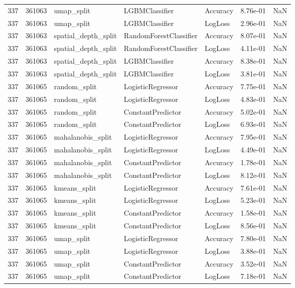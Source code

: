 \begin{tabular}{rrlllrr}
337 & 361063 & umap\_split & LGBMClassifier & Accuracy & 8.76e-01 & NaN \\
337 & 361063 & umap\_split & LGBMClassifier & LogLoss & 2.96e-01 & NaN \\
337 & 361063 & spatial\_depth\_split & RandomForestClassifier & Accuracy & 8.07e-01 & NaN \\
337 & 361063 & spatial\_depth\_split & RandomForestClassifier & LogLoss & 4.11e-01 & NaN \\
337 & 361063 & spatial\_depth\_split & LGBMClassifier & Accuracy & 8.38e-01 & NaN \\
337 & 361063 & spatial\_depth\_split & LGBMClassifier & LogLoss & 3.81e-01 & NaN \\
337 & 361065 & random\_split & LogisticRegressor & Accuracy & 7.75e-01 & NaN \\
337 & 361065 & random\_split & LogisticRegressor & LogLoss & 4.83e-01 & NaN \\
337 & 361065 & random\_split & ConstantPredictor & Accuracy & 5.02e-01 & NaN \\
337 & 361065 & random\_split & ConstantPredictor & LogLoss & 6.93e-01 & NaN \\
337 & 361065 & mahalanobis\_split & LogisticRegressor & Accuracy & 7.95e-01 & NaN \\
337 & 361065 & mahalanobis\_split & LogisticRegressor & LogLoss & 4.49e-01 & NaN \\
337 & 361065 & mahalanobis\_split & ConstantPredictor & Accuracy & 1.78e-01 & NaN \\
337 & 361065 & mahalanobis\_split & ConstantPredictor & LogLoss & 8.12e-01 & NaN \\
337 & 361065 & kmeans\_split & LogisticRegressor & Accuracy & 7.61e-01 & NaN \\
337 & 361065 & kmeans\_split & LogisticRegressor & LogLoss & 5.23e-01 & NaN \\
337 & 361065 & kmeans\_split & ConstantPredictor & Accuracy & 1.58e-01 & NaN \\
337 & 361065 & kmeans\_split & ConstantPredictor & LogLoss & 8.56e-01 & NaN \\
337 & 361065 & umap\_split & LogisticRegressor & Accuracy & 7.80e-01 & NaN \\
337 & 361065 & umap\_split & LogisticRegressor & LogLoss & 3.88e-01 & NaN \\
337 & 361065 & umap\_split & ConstantPredictor & Accuracy & 3.52e-01 & NaN \\
337 & 361065 & umap\_split & ConstantPredictor & LogLoss & 7.18e-01 & NaN \\

\end{tabular}
